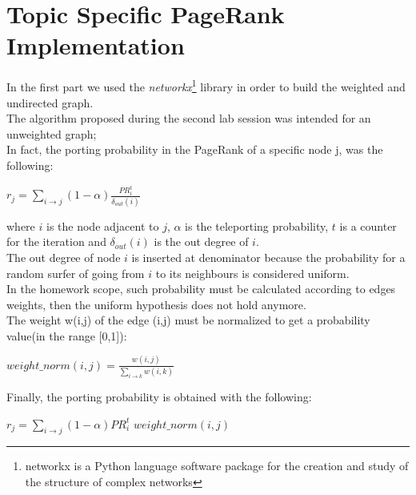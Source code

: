 \documentclass[11pt]{article}
\begin{document}
\section{Topic Specific PageRank Implementation}
In the first part we used the \textit{networkx}\footnote{networkx is a Python language software package for the creation
and study of the structure of complex networks} library in order to build the weighted and undirected graph.\\
The algorithm proposed during the second lab session was intended for an unweighted graph;\\
In fact, the porting probability in the PageRank of a specific node j, was the following:\\
\begin{center}
$ r_j =\sum_{i\rightarrow j}(1-\alpha) \frac{PR_{i}^{t}}{\delta_{out}(i)}$
\end{center}
where $i$ is the node adjacent to $j$, $\alpha$ is the teleporting probability, $t$ is a counter for the
iteration and $\delta_{out}(i)$ is the out degree of $i$.\\
The out degree of node $i$ is inserted at denominator because the probability for a random surfer
of going from $i$ to its neighbours is considered uniform.\\
In the homework scope, such probability must be calculated according to edges weights, then
the uniform hypothesis does not hold anymore.\\
The weight w(i,j) of the edge (i,j) must be normalized to get a probability value(in the
range [0,1]):\\
\begin{center}
$weight\_norm(i,j) = \frac{w(i,j)}{\sum_{i\rightarrow k}w(i,k)}$\\
\end{center}
Finally, the porting probability is obtained with the following:\\
\begin{center}
$ r_j =\sum_{i\rightarrow j}(1-\alpha)PR_{i}^{t}$ $weight\_norm(i,j)$\\
\end{center}
\end{document}
